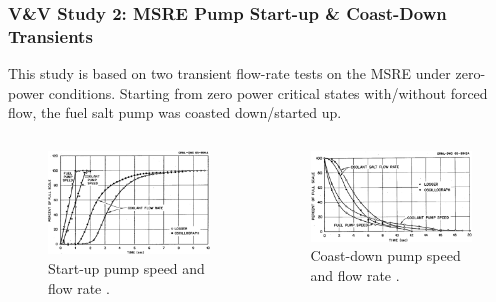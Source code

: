 \begin{frame}
  \frametitle{V\&V Study 2: MSRE Pump Start-up \& Coast-Down Transients}
  This study is based on two transient flow-rate tests on the MSRE under zero-power conditions.
  Starting from zero power critical states with/without forced flow, the fuel salt pump was coasted
  down/started up.
  \pause
  \begin{columns}
    \column[t]{5.5cm}
    \begin{figure}
      \centering
      \includegraphics[width=.8\columnwidth]{images/msre-startup}
      \caption{Start-up pump speed and flow rate \cite{prince_zero-power_1968}.}
    \end{figure}
    \column[t]{5.5cm}
    \begin{figure}
      \centering
      \includegraphics[width=.95\columnwidth]{images/msre-coastdown}
      \caption{Coast-down pump speed and flow rate \cite{prince_zero-power_1968}.}
    \end{figure}
  \end{columns}
\end{frame}

